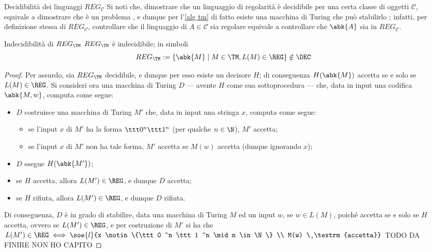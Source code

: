 \documentclass[a4paper, 12pt]{report}
\begin{document}
    \begin{framedobs}{Decidibilità dei linguaggi $REG_\mathcal C$}
        Si noti che, dimostrare che un linguaggio di regolarità è decidibile per una certa classe di oggetti $\mathcal{C}$, equivale a dimostrare che  è un problema , e dunque per l'\cref{alg tm} di fatto esiste una macchina di Turing che può stabilirlo ; infatti, per definizione stessa di $REG_\mathcal C$, controllare che il linguaggio di $A \in \mathcal{C}$ sia regolare equivale a controllare che $\abk{A}$ sia in $REG_\mathcal{C}$.
    \end{framedobs}

    \begin{framedthm}{Indecidibilità di $REG_\TM$}
        $REG_\TM$ è indecidibile; in simboli $$REG_\TM := \{\abk{M} \mid M \in \TM , L(M) \in \REG\} \notin \DEC$$
    \end{framedthm}

    \begin{proof}
        Per assurdo, sia $REG_\TM$ decidibile, e dunque per esso esiste un decisore $H$; di conseguenza $H(\abk{M})$ accetta se e solo se $L(M) \in \REG$. Si consideri ora una macchina di Turing $D$ --- avente $H$ come sua sottoprocedura --- che, data in input una codifica $\abk{M, w}$, computa come segue:

        \begin{itemize}
            \item $D$ costruisce una macchina di Turing $M'$ che, data in input una stringa $x$, computa come segue:
                \begin{itemize}
                    \item se l'input $x$ di $M'$ ha la forma $\ttt 0^n \ttt 1 ^n$ (per qualche $n \in \N$), $M'$ accetta;
                    \item se l'input $x$ di $M'$ non ha tale forma, $M'$ accetta se $M(w)$ accetta (dunque ignorando $x$);
                \end{itemize}
            \item $D$ esegue $H(\abk{M'})$;
            \item se $H$ accetta, allora $L(M') \in \REG$, e dunque $D$ accetta;
            \item se $H$ rifiuta, allora $L(M') \in \REG$, e dunque $D$ rifiuta.
        \end{itemize}

        Di conseguenza, $D$ è in grado di stabilire, data una macchina di Turing $M$ ed un input $w$, se $w \in L(M)$, poiché accetta se e solo se $H$ accetta, ovvero se $L(M') \in \REG$, e per costruzione di $M'$ si ha che $L(M') \in \REG \iff \soe{l}{x \notin \{\ttt 0 ^n \ttt 1 ^n \mid n \in \N\} \\ M(w) \ \textrm{accetta}}$ TODO DA FINIRE NON HO CAPITO
    \end{proof}
\end{document}
